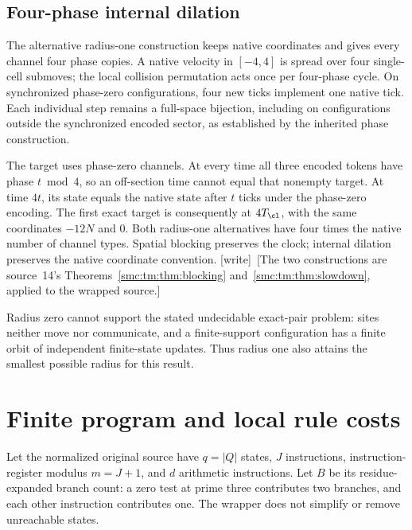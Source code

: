 \documentclass[11pt,letterpaper]{article}
\numberwithin{equation}{section}
\theoremstyle{definition}
\theoremstyle{remark}
\newcommand{\wtag}{\textup{[write]}}
\begin{document}
\subsection{Four-phase internal dilation}

The alternative radius-one construction keeps native coordinates and gives every channel four phase copies. A native velocity in $[-4,4]$ is spread over four single-cell submoves; the local collision permutation acts once per four-phase cycle. On synchronized phase-zero configurations, four new ticks implement one native tick. Each individual step remains a full-space bijection, including on configurations outside the synchronized encoded sector, as established by the inherited phase construction.

The target uses phase-zero channels. At every time all three encoded tokens have phase $t\bmod4$, so an off-section time cannot equal that nonempty target. At time $4t$, its state equals the native state after $t$ ticks under the phase-zero encoding. The first exact target is consequently at $4T_{\cl}$, with the same coordinates $-12N$ and $0$. Both radius-one alternatives have four times the native number of channel types. Spatial blocking preserves the clock; internal dilation preserves the native coordinate convention. \wtag\ [The two constructions are source~14's Theorems~\ref{smc:tm:thm:blocking} and~\ref{smc:tm:thm:slowdown}, applied to the wrapped source.]

Radius zero cannot support the stated undecidable exact-pair problem: sites neither move nor communicate, and a finite-support configuration has a finite orbit of independent finite-state updates. Thus radius one also attains the smallest possible radius for this result.

\section{Finite program and local rule costs}\label{smc:ct:sec:counts}

Let the normalized original source have $q=|Q|$ states, $J$ instructions, instruction-register modulus $m=J+1$, and $d$ arithmetic instructions. Let $B$ be its residue-expanded branch count: a zero test at prime three contributes two branches, and each other instruction contributes one. The wrapper does not simplify or remove unreachable states.
\end{document}
